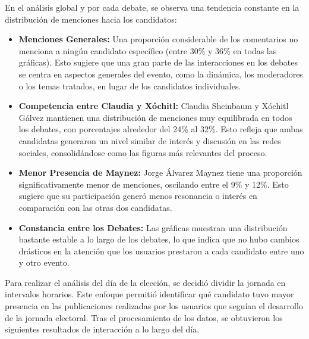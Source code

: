 \documentclass[10pt, a4paper]{article}
\begin{document}
	
	En el análisis global y por cada debate, se observa una tendencia constante en la distribución de menciones hacia los candidatos:
	
	\begin{itemize}
		\item \textbf{Menciones Generales:} Una proporción considerable de los comentarios no menciona a ningún candidato específico (entre 30\% y 36\% en todas las gráficas). Esto sugiere que una gran parte de las interacciones en los debates se centra en aspectos generales del evento, como la dinámica, los moderadores o los temas tratados, en lugar de los candidatos individuales.
		
		\item \textbf{Competencia entre Claudia y Xóchitl:} Claudia Sheinbaum y Xóchitl Gálvez mantienen una distribución de menciones muy equilibrada en todos los debates, con porcentajes alrededor del 24\% al 32\%. Esto refleja que ambas candidatas generaron un nivel similar de interés y discusión en las redes sociales, consolidándose como las figuras más relevantes del proceso.
		
		\item \textbf{Menor Presencia de Maynez:} Jorge Álvarez Maynez tiene una proporción significativamente menor de menciones, oscilando entre el 9\% y 12\%. Esto sugiere que su participación generó menos resonancia o interés en comparación con las otras dos candidatas.
		
		\item \textbf{Constancia entre los Debates:} Las gráficas muestran una distribución bastante estable a lo largo de los debates, lo que indica que no hubo cambios drásticos en la atención que los usuarios prestaron a cada candidato entre uno y otro evento.
	\end{itemize}

	Para realizar el análisis del día de la elección, se decidió dividir la jornada en intervalos horarios. Este enfoque permitió identificar qué candidato tuvo mayor presencia en las publicaciones realizadas por los usuarios que seguían el desarrollo de la jornada electoral. Tras el procesamiento de los datos, se obtuvieron los siguientes resultados de interacción a lo largo del día.
	
\end{document}
